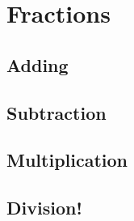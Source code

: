 \documentclass[a4paper, 12pt]{article}
\begin{document}
	
	
	{\Large \section {Fractions}}
	
	\subsection{Adding}
	\subsection{Subtraction}
	\subsection{Multiplication}
	\subsection{Division!}

	
		
\end{document}
